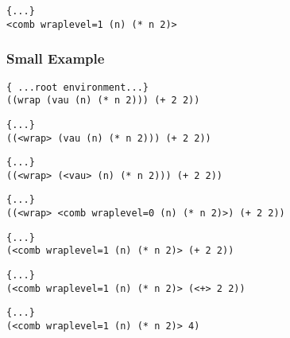 \documentclass{beamer}
\begin{document}
\begin{frame}[fragile]
\footnotesize
\begin{verbatim}
{...}
<comb wraplevel=1 (n) (* n 2)>
\end{verbatim}
\end{frame}

\begin{frame}[fragile]
\frametitle{Small Example}
\footnotesize
\begin{verbatim}
{ ...root environment...}
((wrap (vau (n) (* n 2))) (+ 2 2))
\end{verbatim}
\end{frame}

\begin{frame}[fragile]
\footnotesize
\begin{verbatim}
{...}
((<wrap> (vau (n) (* n 2))) (+ 2 2))
\end{verbatim}
\end{frame}

\begin{frame}[fragile]
\footnotesize
\begin{verbatim}
{...}
((<wrap> (<vau> (n) (* n 2))) (+ 2 2))
\end{verbatim}
\end{frame}

\begin{frame}[fragile]
\footnotesize
\begin{verbatim}
{...}
((<wrap> <comb wraplevel=0 (n) (* n 2)>) (+ 2 2))
\end{verbatim}
\end{frame}

\begin{frame}[fragile]
\footnotesize
\begin{verbatim}
{...}
(<comb wraplevel=1 (n) (* n 2)> (+ 2 2))
\end{verbatim}
\end{frame}

\begin{frame}[fragile]
\footnotesize
\begin{verbatim}
{...}
(<comb wraplevel=1 (n) (* n 2)> (<+> 2 2))
\end{verbatim}
\end{frame}

\begin{frame}[fragile]
\footnotesize
\begin{verbatim}
{...}
(<comb wraplevel=1 (n) (* n 2)> 4)
\end{verbatim}
\end{frame}
\end{document}
